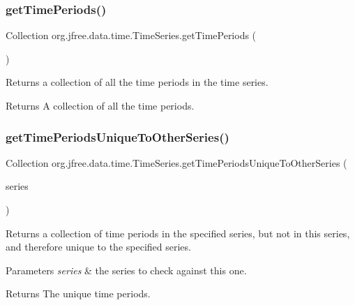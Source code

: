 \subsubsection{\texorpdfstring{get\+Time\+Periods()}{getTimePeriods()}}
{\footnotesize\ttfamily Collection org.\+jfree.\+data.\+time.\+Time\+Series.\+get\+Time\+Periods (\begin{DoxyParamCaption}{ }\end{DoxyParamCaption})}

Returns a collection of all the time periods in the time series.

\begin{DoxyReturn}{Returns}
A collection of all the time periods. 
\end{DoxyReturn}
\mbox{\label{classorg_1_1jfree_1_1data_1_1time_1_1_time_series_ab40303da4d1d5bbeb83721795ddceaa0}} 
\subsubsection{\texorpdfstring{get\+Time\+Periods\+Unique\+To\+Other\+Series()}{getTimePeriodsUniqueToOtherSeries()}}
{\footnotesize\ttfamily Collection org.\+jfree.\+data.\+time.\+Time\+Series.\+get\+Time\+Periods\+Unique\+To\+Other\+Series (\begin{DoxyParamCaption}\item[{\mbox{\hyperlink{classorg_1_1jfree_1_1data_1_1time_1_1_time_series}{Time\+Series}}}]{series }\end{DoxyParamCaption})}

Returns a collection of time periods in the specified series, but not in this series, and therefore unique to the specified series.


\begin{DoxyParams}{Parameters}
{\em series} & the series to check against this one.\\
\hline
\end{DoxyParams}
\begin{DoxyReturn}{Returns}
The unique time periods. 
\end{DoxyReturn}
\mbox{\label{classorg_1_1jfree_1_1data_1_1time_1_1_time_series_adee38412e801a3e779d144edd6bdf738}} 
